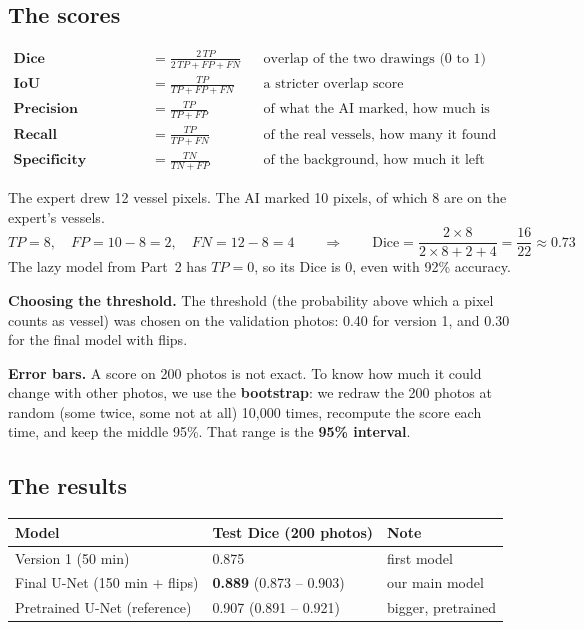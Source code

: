 \documentclass[11pt,a4paper]{article}
\begin{document}
\subsection{The scores}
\begin{align*}
\textbf{Dice} &= \frac{2\,TP}{2\,TP + FP + FN} &&\text{overlap of the two drawings (0 to 1)}\\[2pt]
\textbf{IoU} &= \frac{TP}{TP + FP + FN} &&\text{a stricter overlap score}\\[2pt]
\textbf{Precision} &= \frac{TP}{TP + FP} &&\text{of what the AI marked, how much is right}\\[2pt]
\textbf{Recall (sensitivity)} &= \frac{TP}{TP + FN} &&\text{of the real vessels, how many it found}\\[2pt]
\textbf{Specificity} &= \frac{TN}{TN + FP} &&\text{of the background, how much it left alone}
\end{align*}

\begin{example}
The expert drew 12 vessel pixels. The AI marked 10 pixels, of which 8 are on the expert's vessels.
\[
TP = 8,\quad FP = 10 - 8 = 2,\quad FN = 12 - 8 = 4
\qquad\Rightarrow\qquad
\text{Dice} = \frac{2\times8}{2\times8 + 2 + 4} = \frac{16}{22} \approx 0.73
\]
The lazy model from Part~2 has $TP = 0$, so its Dice is 0, even with 92\% accuracy.
\end{example}

\textbf{Choosing the threshold.} The threshold (the probability above which a pixel counts as vessel) was chosen on the validation photos: 0.40 for version 1, and 0.30 for the final model with flips.

\textbf{Error bars.} A score on 200 photos is not exact. To know how much it could change with other photos, we use the \textbf{bootstrap}: we redraw the 200 photos at random (some twice, some not at all) 10,000 times, recompute the score each time, and keep the middle 95\%. That range is the \textbf{95\% interval}.

\subsection{The results}
\begin{center}
\begin{tabular}{@{}lll@{}}
\toprule
\textbf{Model} & \textbf{Test Dice (200 photos)} & \textbf{Note} \\
\midrule
Version 1 (50 min) & 0.875 & first model \\
Final U-Net (150 min + flips) & \textbf{0.889} (0.873 -- 0.903) & our main model \\
Pretrained U-Net (reference) & 0.907 (0.891 -- 0.921) & bigger, pretrained \\
\bottomrule
\end{tabular}
\end{center}
\end{document}
